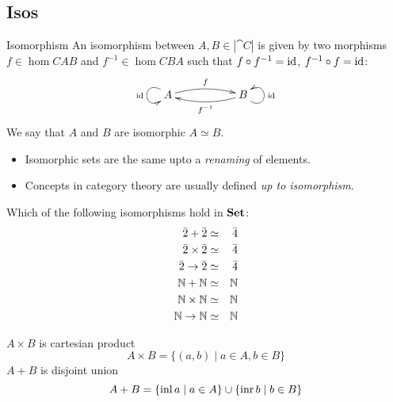 \documentclass[handout]{beamer}
\newcommand{\ru}[2]{\vspace{1ex}
\begin{prooftree}
#1 \justifies #2
\end{prooftree}\vspace{1ex}}
\begin{document}
\subsection{Isos}

\begin{frame}

  \begin{block}{Isomorphism}
    An isomorphism between $A,B \in |\cat{C}|$ is given by two
    morphisms $f\in \hom{C}{A}{B}$ and $f^{-1}\in\hom{C}{B}{A}$ such
    that $f\circ f^{-1} = \mathrm{id}$, $f^{-1} \circ f = \mathrm{id}$:
    \[\xymatrix{ A \ar@(ul,dl)[]_{\id} \ar@/^/[rr]^f
      &&  B  \ar@/^/[ll]^{f^{-1}} \ar@(dr,ur)[]_{\id}\\
    }\]
    We say that $A$ and $B$ are isomorphic $A\simeq B$.
  \end{block}

  \pause
  \begin{itemize}
  \item<+-> Isomorphic sets are the same upto a \emph{renaming} of elements.
  \item<+-> Concepts in category theory are usually defined \emph{up to isomorphism}.
  \end{itemize}


\end{frame}

\begin{frame}
  \begin{exercise}
  Which of the following isomorphisms hold in $\mathbf{Set}$:
  \begin{eqnarray*}
    \bar{2} + \bar{2} & \simeq & \bar{4} \\
    \bar{2} \times \bar{2} & \simeq & \bar{4} \\
    \bar{2} \to \bar{2} & \simeq & \bar{4} \\
    \mathbb{N} + \mathbb{N} & \simeq & \mathbb{N} \\
    \mathbb{N} \times \mathbb{N} & \simeq & \mathbb{N} \\
    \mathbb{N} \to \mathbb{N} & \simeq & \mathbb{N}
  \end{eqnarray*}
\end{exercise}

  $A\times B$ is cartesian product
  \[ A \times B = \{ (a,b) \mid a\in A, b\in B \} \]
  $A+B$ is disjoint union
  \[ A + B = \{ \mathrm{inl}\, a \mid a\in A\} \cup \{ \mathrm{inr}\,b \mid b\in B \}\]


\end{frame}
\end{document}

